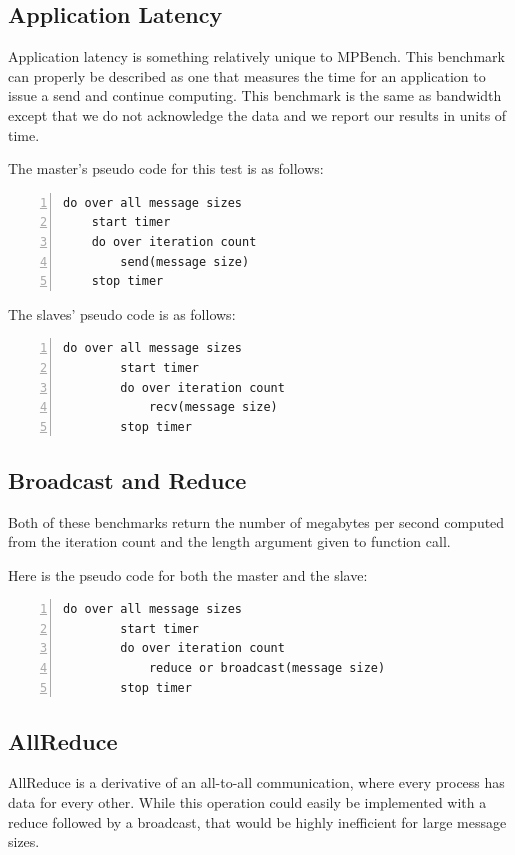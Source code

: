 \subsection{Application Latency}

Application latency is something relatively unique to MPBench. This benchmark
can properly be described as one that measures the time for an application
to issue a send and continue computing. This benchmark is the same as
bandwidth except that we do not acknowledge the data and we report our
results in units of time.

The master's pseudo code for this test is as follows:

\begin{lstlisting}[frame=single,numbers=left]
do over all message sizes 
    start timer
    do over iteration count 
        send(message size) 
    stop timer
\end{lstlisting}    

The slaves' pseudo code is as follows:

\begin{lstlisting}[frame=single,numbers=left]
   do over all message sizes 
        start timer
        do over iteration count 
            recv(message size) 
        stop timer
\end{lstlisting}

\subsection{Broadcast and Reduce}

Both of these benchmarks return the number of megabytes per second computed
from the iteration count and the length argument given to function call.

Here is the pseudo code for both the master and the slave:


\begin{lstlisting}[frame=single,numbers=left]
   do over all message sizes 
        start timer
        do over iteration count
            reduce or broadcast(message size)
        stop timer
\end{lstlisting}

\subsection{AllReduce}

AllReduce is a derivative of an all-to-all communication, where every
process has data for every other. While this operation could easily be
implemented with a reduce followed by a broadcast, that would be highly
inefficient for large message sizes. 

